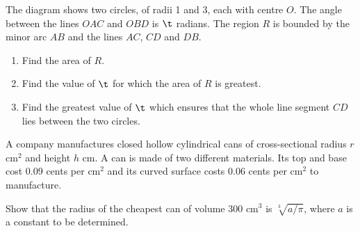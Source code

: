\begin{problem}
    The diagram shows two circles, of radii 1 and 3, each with centre $O$. The angle between the lines $OAC$ and $OBD$ is $\t$ radians. The region $R$ is bounded by the minor arc $AB$ and the lines $AC$, $CD$ and $DB$.

    \begin{center}
    \end{center}

    \begin{enumerate}
        \item Find the area of $R$.
        \item Find the value of $\t$ for which the area of $R$ is greatest.
        \item Find the greatest value of $\t$ which ensures that the whole line segment $CD$ lies between the two circles.
    \end{enumerate}
\end{problem}

\begin{problem}
    A company manufactures closed hollow cylindrical cans of cross-sectional radius $r$ cm$^2$ and height $h$ cm. A can is made of two different materials. Its top and base cost 0.09 cents per cm$^2$ and its curved surface costs 0.06 cents per cm$^2$ to manufacture.

    Show that the radius of the cheapest can of volume 300 cm$^3$ is $\sqrt[3]{a/\pi}$, where $a$ is a constant to be determined.
\end{problem}

